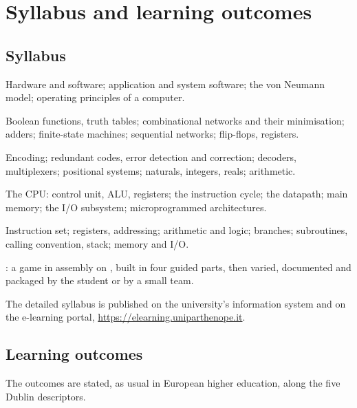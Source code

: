 \section{Syllabus and learning outcomes}

\subsection{Syllabus}

\begin{description}[style=nextline,leftmargin=1.5em]
\item[Computer organisation.] Hardware and software; application and system
  software; the von Neumann model; operating principles of a computer.
\item[Boolean algebra and logic.] Boolean functions, truth tables;
  combinational networks and their minimisation; adders; finite-state
  machines; sequential networks; flip-flops, registers.
\item[Data representation.] Encoding; redundant codes, error detection and
  correction; decoders, multiplexers; positional systems; naturals, integers,
  reals; arithmetic.
\item[Structure of a computer.] The CPU: control unit, ALU, registers; the
  instruction cycle; the datapath; main memory; the I/O subsystem;
  microprogrammed architectures.
\item[RISC-V assembly.] Instruction set; registers, addressing; arithmetic and
  logic; branches; subroutines, calling convention, stack; memory and I/O.
\item[Project.] \vermone: a game in \riscv assembly on \prg, built in four
  guided parts, then varied, documented and packaged by the student or by a
  small team.
\end{description}

The detailed syllabus is published on the university's information system and
on the e-learning portal, \url{https://elearning.uniparthenope.it}.

\subsection{Learning outcomes}

The outcomes are stated, as usual in European higher education, along the five
Dublin descriptors.

